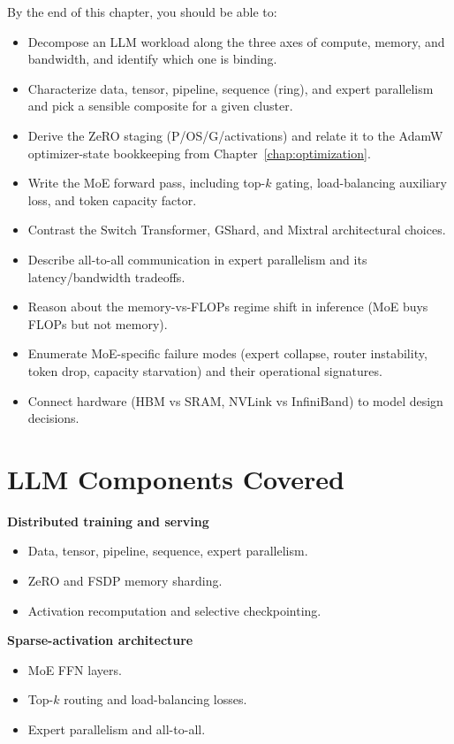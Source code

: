 By the end of this chapter, you should be able to:
\begin{itemize}
  \item Decompose an LLM workload along the three axes of compute,
        memory, and bandwidth, and identify which one is binding.
  \item Characterize data, tensor, pipeline, sequence (ring), and
        expert parallelism and pick a sensible composite for a given
        cluster.
  \item Derive the ZeRO staging (P/OS/G/activations) and relate it to
        the AdamW optimizer-state bookkeeping from Chapter~\ref{chap:optimization}.
  \item Write the MoE forward pass, including top-$k$ gating,
        load-balancing auxiliary loss, and token capacity factor.
  \item Contrast the Switch Transformer, GShard, and Mixtral
        architectural choices.
  \item Describe all-to-all communication in expert parallelism and
        its latency/bandwidth tradeoffs.
  \item Reason about the memory-vs-FLOPs regime shift in inference
        (MoE buys FLOPs but not memory).
  \item Enumerate MoE-specific failure modes (expert collapse, router
        instability, token drop, capacity starvation) and their
        operational signatures.
  \item Connect hardware (HBM vs SRAM, NVLink vs InfiniBand) to model
        design decisions.
\end{itemize}

\section{LLM Components Covered}

\textbf{Distributed training and serving}
\begin{itemize}
  \item Data, tensor, pipeline, sequence, expert parallelism.
  \item ZeRO and FSDP memory sharding.
  \item Activation recomputation and selective checkpointing.
\end{itemize}

\textbf{Sparse-activation architecture}
\begin{itemize}
  \item MoE FFN layers.
  \item Top-$k$ routing and load-balancing losses.
  \item Expert parallelism and all-to-all.
\end{itemize}

